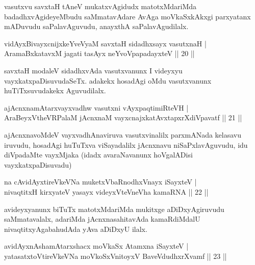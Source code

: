 \begin{artha}
vasutxvu savxtaH tAneV mukatxvAgidudx matotxMdariMda badadhxvAgideyeMbudu saMmatavAdare AvAga moVkaSxkAkxgi parxyatanx mADuvudu saPalavAguvudu, anayxthA saPalavAgudilalx.
\end{artha}


\begin{shl}
vidAyx\s BivayxcnijxkeYveVyaM savxtaH sidadhxsayx vasutxnaH |\\
AramaBxkatavxM jagati tasAyx neYvoVpapadayxteV \hfill || 20 ||
\end{shl}

\begin{artha}
savxtaH modaleV sidadhxvAda vasutxvanunx I videyxyu vayxkatxpaDisuvudaSeTx. adakekx hosadAgi oMdu vasutxvanunx huTiTxsuvudakekx Aguvudilalx.
\end{artha}

\begin{shl}
ajAcnxnamAtarxvayxvadhw vasutxni vAyxpaqtimiRteVH |\\
AraBeyxV\s theVR\s PalaM jAcnxnaM vayxcnajxkatAvxtapxrXdiVpavatf \hfill || 21 ||
\end{shl}

\begin{artha}
ajAcnxnavoMdeV vayxvadhAnaviruva vasutxvinalilx parxmANada kelasavu iruvudu, hosadAgi huTuTxva viSayadalilx jAcnxnavu niSaPxlavAguvudu, idu diVpadaMte vayxMjaka (idadx avaraNavanunx hoVgalADisi vayxkatxpaDisuvadu)
\end{artha}


\begin{shl}
na cAvidAyxtireVkeVNa muketxVbaRnodhxV\s nayx iSayxteV |\\
nivaqtitxH kirxyateV yasayx videyxVteVneVha kamaRNA \hfill || 22 ||
\end{shl}

\begin{artha}
avideyxyanunx biTuTx matotxMdariMda mukitxge aDiDxyAgiruvudu saMmatavalalx, adariMda jAcnxnasahitavAda kamaRdiMdalU nivaqtitxyAgabahudAda yAva aDiDxyU ilalx.
\end{artha}

\begin{shl}
avidAyxnAshamAtarxshacx moVkaSx Atamxna iSayxteV |\\
yatasatxtoV\s tireVkeVNa moVkoSxV\s nitoyxV BaveVdudhxrXvamf \hfill || 23 ||
\end{shl}

